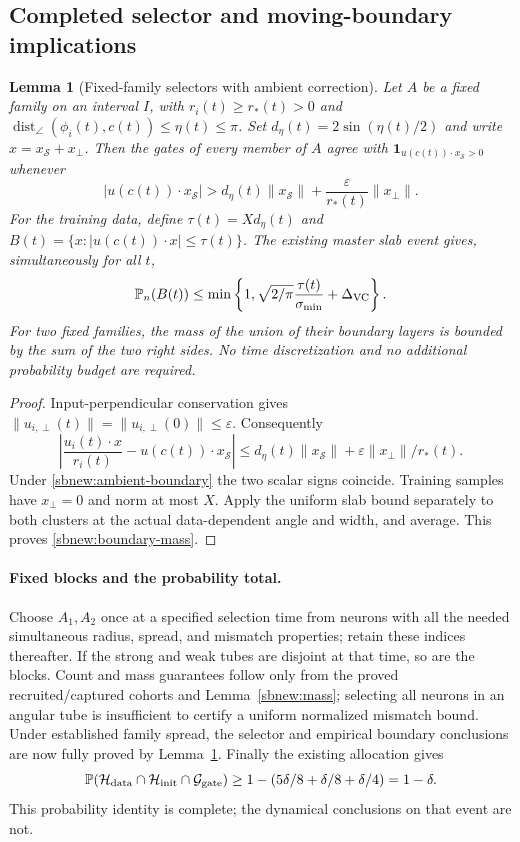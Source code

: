 \documentclass{article} %
\theoremstyle{plain}
\newtheorem{lemma}[theorem]{Lemma}
\theoremstyle{definition}
\theoremstyle{remark}
\begin{document}
\subsection{Completed selector and moving-boundary implications}
\begin{lemma}[Fixed-family selectors with ambient correction]
\label{sbnew:selectors}
Let $A$ be a fixed family on an interval $I$, with
$r_i(t)\ge r_*(t)>0$ and
$\operatorname{dist}_\angle(\phi_i(t),c(t))\le\eta(t)\le\pi$.
Set $d_\eta(t)=2\sin(\eta(t)/2)$ and write $x=x_{\mathcal S}+x_\perp$.
Then the gates of every member of $A$ agree with
$\mathbf1_{u(c(t))\cdot x_{\mathcal S}>0}$ whenever
\begin{equation}\label{sbnew:ambient-boundary}
 |u(c(t))\cdot x_{\mathcal S}|>
 d_\eta(t)\|x_{\mathcal S}\|+
 \frac{\varepsilon}{r_*(t)}\|x_\perp\|.
\end{equation}
For the training data, define
$\tau(t)=Xd_\eta(t)$ and
$B(t)=\{x:|u(c(t))\cdot x|\le\tau(t)\}$.
The existing master slab event gives, simultaneously for all $t$,
\begin{equation}\label{sbnew:boundary-mass}
 \mathbb P_n(B(t))\le
 \min\left\{1,\sqrt{2/\pi}\frac{\tau(t)}{\sigma_{\min}}
                   +\Delta_{\rm VC}\right\}.
\end{equation}
For two fixed families, the mass of the union of their boundary layers
is bounded by the sum of the two right sides. No time discretization and
no additional probability budget are required.
\end{lemma}
\begin{proof}
Input-perpendicular conservation gives
$\|u_{i,\perp}(t)\|=\|u_{i,\perp}(0)\|\le\varepsilon$.
Consequently
\[
 \left|\frac{u_i(t)\cdot x}{r_i(t)}-u(c(t))\cdot x_{\mathcal S}\right|
 \le d_\eta(t)\|x_{\mathcal S}\|
           +\varepsilon\|x_\perp\|/r_*(t).
\]
Under \eqref{sbnew:ambient-boundary} the two scalar signs coincide.
Training samples have $x_\perp=0$ and norm at most $X$.
Apply the uniform slab bound separately to both clusters at the actual
data-dependent angle and width, and average. This proves
\eqref{sbnew:boundary-mass}.
\end{proof}

\paragraph{Fixed blocks and the probability total.}
Choose $A_1,A_2$ once at a specified selection time from neurons with all
the needed simultaneous radius, spread, and mismatch properties; retain
these indices thereafter. If the strong and weak tubes are disjoint at
that time, so are the blocks. Count and mass guarantees follow only from
the proved recruited/captured cohorts and Lemma~\ref{sbnew:mass}; selecting
all neurons in an angular tube is insufficient to certify a uniform
normalized mismatch bound. Under established family spread, the selector
and empirical boundary conclusions are now fully proved by
Lemma~\ref{sbnew:selectors}. Finally the existing allocation gives
\[
 \mathbb P(\mathcal H_{\rm data}\cap\mathcal H_{\rm init}
                    \cap\mathcal G_{\rm gate})
 \ge1-(5\delta/8+\delta/8+\delta/4)=1-\delta.
\]
This probability identity is complete; the dynamical conclusions on that
event are not.
\end{document}
